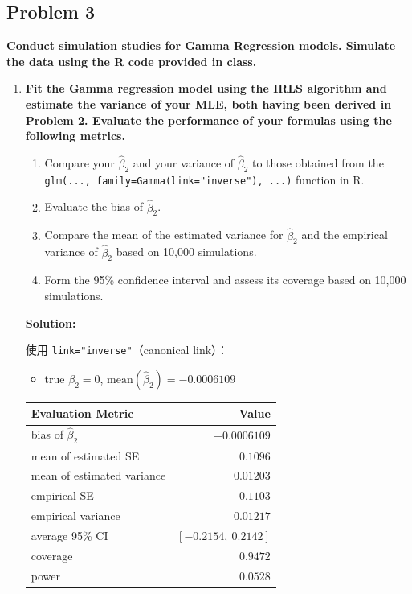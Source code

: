 \subsection{Problem 3}

\textbf{Conduct simulation studies for Gamma Regression models. Simulate the data using the R code provided in class.}

\begin{enumerate}
\item[(a)] \textbf{Fit the Gamma regression model using the IRLS algorithm and estimate the variance of your MLE, both having been derived in Problem 2. Evaluate the performance of your formulas using the following metrics.}

\begin{enumerate}
\item[i.] Compare your $\hat{\beta}_2$ and your variance of $\hat{\beta}_2$ to those obtained from the \texttt{glm(..., family=Gamma(link="inverse"), ...)} function in R.
\item[ii.] Evaluate the bias of $\hat{\beta}_2$.
\item[iii.] Compare the mean of the estimated variance for $\hat{\beta}_2$ and the empirical variance of $\hat{\beta}_2$ based on 10,000 simulations.
\item[iv.] Form the 95\% confidence interval and assess its coverage based on 10,000 simulations.
\end{enumerate}

\textbf{Solution:}

使用 \texttt{link="inverse"}（canonical link）：

\begin{itemize}
\item true $\beta_2 = 0$, $\text{mean}(\hat{\beta}_2) = -0.0006109$
\end{itemize}

\begin{table}[h]
\centering
\begin{tabular}{lr}
\toprule
Evaluation Metric & Value \\
\midrule
bias of $\hat{\beta}_2$ & $-0.0006109$ \\
mean of estimated SE & $0.1096$ \\
mean of estimated variance & $0.01203$ \\
empirical SE & $0.1103$ \\
empirical variance & $0.01217$ \\
average 95\% CI & $[-0.2154,\ 0.2142]$ \\
coverage & $0.9472$ \\
power & $0.0528$ \\
\bottomrule
\end{tabular}
\end{table}


\end{enumerate}
